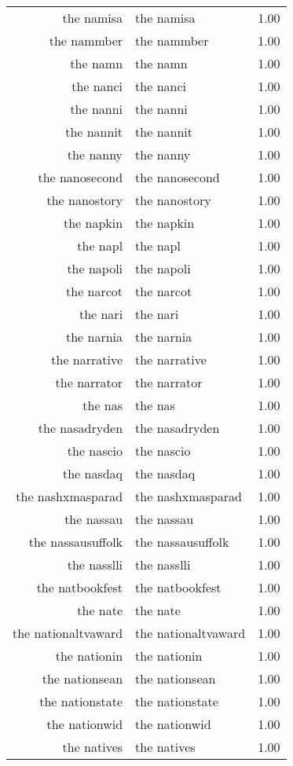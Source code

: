 \begin{table}[ht]
\begin{tabular}{rlr}
  the namisa & the namisa & 1.00 \\ 
  the nammber & the nammber & 1.00 \\ 
  the namn & the namn & 1.00 \\ 
  the nanci & the nanci & 1.00 \\ 
  the nanni & the nanni & 1.00 \\ 
  the nannit & the nannit & 1.00 \\ 
  the nanny & the nanny & 1.00 \\ 
  the nanosecond & the nanosecond & 1.00 \\ 
  the nanostory & the nanostory & 1.00 \\ 
  the napkin & the napkin & 1.00 \\ 
  the napl & the napl & 1.00 \\ 
  the napoli & the napoli & 1.00 \\ 
  the narcot & the narcot & 1.00 \\ 
  the nari & the nari & 1.00 \\ 
  the narnia & the narnia & 1.00 \\ 
  the narrative & the narrative & 1.00 \\ 
  the narrator & the narrator & 1.00 \\ 
  the nas & the nas & 1.00 \\ 
  the nasadryden & the nasadryden & 1.00 \\ 
  the nascio & the nascio & 1.00 \\ 
  the nasdaq & the nasdaq & 1.00 \\ 
  the nashxmasparad & the nashxmasparad & 1.00 \\ 
  the nassau & the nassau & 1.00 \\ 
  the nassausuffolk & the nassausuffolk & 1.00 \\ 
  the nasslli & the nasslli & 1.00 \\ 
  the natbookfest & the natbookfest & 1.00 \\ 
  the nate & the nate & 1.00 \\ 
  the nationaltvaward & the nationaltvaward & 1.00 \\ 
  the nationin & the nationin & 1.00 \\ 
  the nationsean & the nationsean & 1.00 \\ 
  the nationstate & the nationstate & 1.00 \\ 
  the nationwid & the nationwid & 1.00 \\ 
  the natives & the natives & 1.00 \\ 

\end{tabular}
\end{table}

